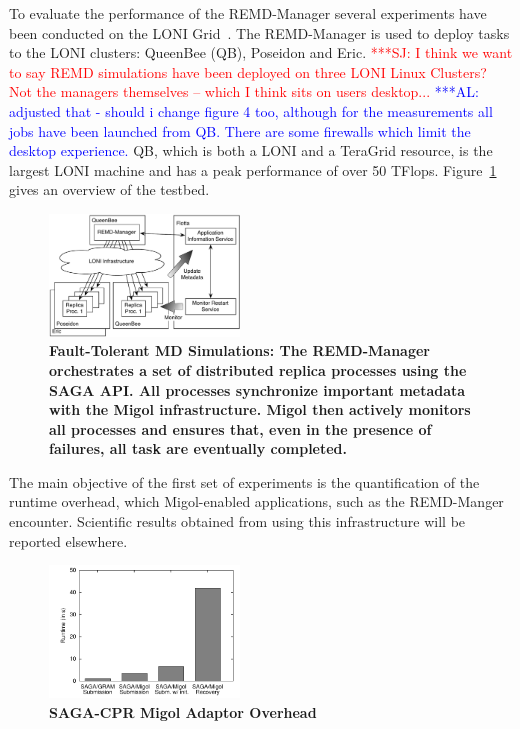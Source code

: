 \documentclass[conference,final]{IEEEtran}
\newcommand{\up}{\vspace*{-1em}}
\newcommand{\alnote}[1]{ {\textcolor{blue} { ***AL: #1 }}}
\newcommand{\jhanote}[1]{ {\textcolor{red} { ***SJ: #1 }}}
\newcommand{\alnote}[1]{}
\newcommand{\jhanote}[1]{}
\begin{document}
\up To evaluate the performance of the REMD-Manager several
experiments have been conducted on the LONI
Grid~\cite{loni}. The REMD-Manager is used to deploy tasks to
the LONI clusters: QueenBee (QB), Poseidon and Eric.  \jhanote{I think
  we want to say REMD simulations have been deployed on three LONI
  Linux Clusters? Not the managers themselves -- which I think sits on
  users desktop...}  \alnote{adjusted that - should i change figure 4
  too, although for the measurements all jobs have been launched from
  QB. There are some firewalls which limit the desktop experience.}
QB, which is both a LONI and a TeraGrid resource, is the largest LONI
machine and has a peak performance of over 50 TFlops.
Figure~\ref{fig:saga-taskfarming} gives an overview of the testbed.

\begin{figure}[t]
    \centering
        \includegraphics[width=0.45\textwidth]{saga-taskfarming}
        \caption{\footnotesize \bf Fault-Tolerant MD Simulations: The
          REMD-Manager orchestrates a set of distributed replica
          processes using the SAGA API. All processes synchronize
          important metadata with the Migol infrastructure. Migol then
          actively monitors all processes and ensures that, even in
          the presence of failures, all task are eventually
          completed.\up}
    \label{fig:saga-taskfarming}
\end{figure} 
The main objective of the first set of experiments is the
quantification of the runtime overhead, which Migol-enabled
applications, such as the REMD-Manger encounter.  Scientific results
obtained from using this infrastructure will be reported elsewhere.

\begin{figure}[ht]
    \centering
        \includegraphics[width=0.45\textwidth]{performance/perf_submission.pdf}
    \up
    \caption{\footnotesize \bf SAGA-CPR Migol Adaptor Overhead}
    \up
    \label{fig:performance_perf_submission}
\end{figure}           
\end{document}
